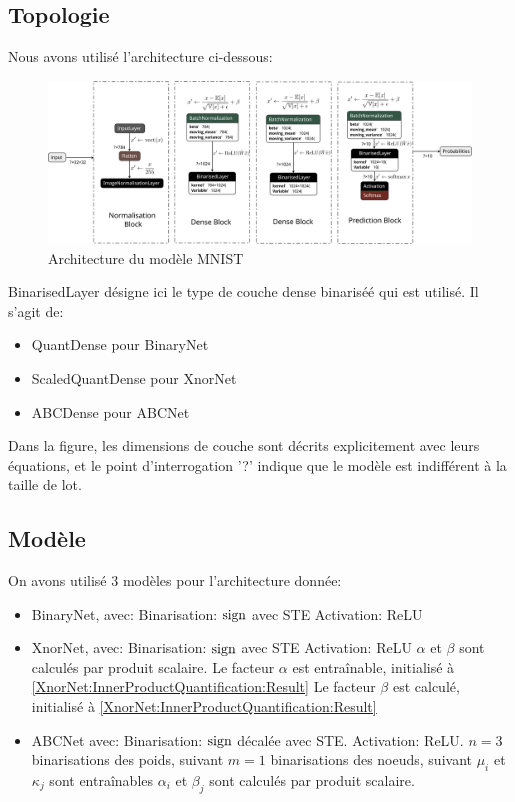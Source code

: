 \subsection{Topologie}
Nous avons utilisé l'architecture ci-dessous:
\begin{figure}[h!]
	\centering
	\includegraphics[width=1\textwidth]{Figures/MNIST-Topology.png}
	\caption{Architecture du modèle MNIST}
	\label{fig:MNIST-Topology}
\end{figure}
\FloatBarrier
BinarisedLayer désigne ici le type de couche dense binariséé qui est utilisé. Il s'agit de:
\begin{itemize}
	\item QuantDense pour BinaryNet
	\item ScaledQuantDense pour XnorNet
	\item ABCDense pour ABCNet
\end{itemize}
Dans la figure, les dimensions de couche sont décrits explicitement avec leurs équations, et le point d'interrogation '?' indique que le modèle est indifférent à la taille de lot.
\subsection{Modèle}
On avons utilisé $3$ modèles pour l'architecture donnée:
\begin{itemize}
	\item BinaryNet, avec:
	\subitem Binarisation: $\operatorname{sign}$ avec STE
	\subitem Activation: ReLU
	\item XnorNet, avec:
	\subitem Binarisation: $\operatorname{sign}$ avec STE
	\subitem Activation: ReLU
	\subitem $\alpha$ et $\beta$ sont calculés par produit scalaire.
	\subitem Le facteur $\alpha$ est entraînable, initialisé à \eqref{XnorNet:InnerProductQuantification:Result}
	\subitem Le facteur $\beta$ est calculé, initialisé à \eqref{XnorNet:InnerProductQuantification:Result}
	\item ABCNet avec:
	\subitem Binarisation: $\operatorname{sign}$ décalée avec STE.
	\subitem Activation: ReLU.
	\subitem $n=3$ binarisations des poids, suivant 
	\subitem $m=1$ binarisations des noeuds, suivant
	\subitem $\mu_i$ et $\kappa_j$ sont entraînables
	\subitem $\alpha_i$ et $\beta_j$ sont calculés par produit scalaire.
	
\end{itemize}
